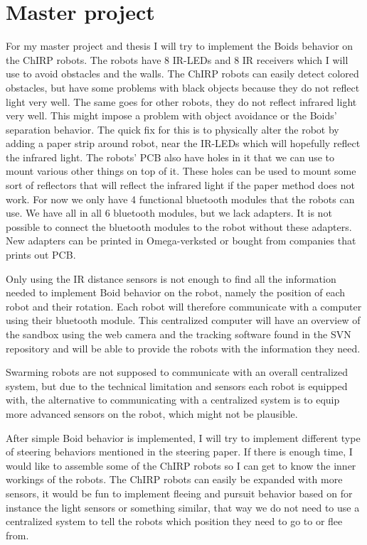 \section{Master project}
For my master project and thesis I will try to implement the Boids behavior on the ChIRP robots. The robots have 8 IR-LEDs and 8 IR receivers which I will use to avoid obstacles and the walls. The ChIRP robots can easily detect colored obstacles, but have some problems with black objects because they do not reflect light very well. The same goes for other robots, they do not reflect infrared light very well. This might impose a problem with object avoidance or the Boids' separation behavior. The quick fix for this is to physically alter the robot by adding a paper strip around robot, near the IR-LEDs which will hopefully reflect the infrared light.
The robots' PCB also have holes in it that we can use to mount various other things on top of it. These holes can be used to mount some sort of reflectors that will reflect the infrared light if the paper method does not work.
For now we only have 4 functional bluetooth modules that the robots can use. We have all in all 6 bluetooth modules, but we lack adapters. It is not possible to connect the bluetooth modules to the robot without these adapters. New adapters can be printed in Omega-verksted or bought from companies that prints out PCB.

Only using the IR distance sensors is not enough to find all the information needed to implement Boid behavior on the robot, namely the position of each robot and their rotation.
Each robot will therefore communicate with a computer using their bluetooth module.
This centralized computer will have an overview of the sandbox using the web camera and the tracking software found in the SVN repository and will be able to provide the robots with the information they need.

Swarming robots are not supposed to communicate with an overall centralized system, but due to the technical limitation and sensors each robot is equipped with, the alternative to communicating with a centralized system is to equip more advanced sensors on the robot, which might not be plausible.

After simple Boid behavior is implemented, I will try to implement different type of steering behaviors mentioned in the steering paper. If there is enough time, I would like to assemble some of the ChIRP robots so I can get to know the inner workings of the robots. The ChIRP robots can easily be expanded with more sensors, it would be fun to implement fleeing and pursuit behavior based on for instance the light sensors or something similar, that way we do not need to use a centralized system to tell the robots which position they need to go to or flee from.

